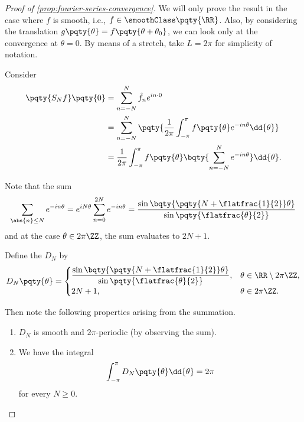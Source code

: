 \begin{proof}[Proof of \autoref{prop:fourier-series-convergence}]
    We will only prove the result in the case where \(f\) is smooth, i.e., \(f \in \smoothClass\pqty{\RR}\). Also, by considering the translation \(g\pqty{\theta} = f\pqty{\theta + \theta_0}\), we can look only at the convergence at \(\theta = 0\). By means of a stretch, take \(L = 2\pi\) for simplicity of notation.

    Consider
    \begin{subequations}
        \begin{align}
            \pqty{S_N f} \pqty{0} &= \sum_{n = -N}^{N} \hat{f}_n e^{in \cdot 0}\\
            &= \sum_{n = -N}^{N} \pqty{\frac{1}{2\pi} \int_{-\pi}^{\pi} f\pqty{\theta} e^{-in \theta} \dd{\theta}} \\
            &= \frac{1}{2\pi} \int_{-\pi}^{\pi} f\pqty{\theta} \bqty{\sum_{n = -N}^{N} e^{-in \theta}} \dd{\theta}.
        \end{align}
    \end{subequations}

    Note that the sum
    \begin{equation}
        \sum_{\abs{n} \leq N} e^{- i n \theta} = e^{i N \theta} \sum_{n = 0}^{2N} e^{- i n \theta} = \frac{\sin\bqty{\pqty{N + \flatfrac{1}{2}} \theta}}{\sin\pqty{\flatfrac{\theta}{2}}}
    \end{equation}
    and at the case \(\theta \in 2 \pi \ZZ\), the sum evaluates to \(2N + 1\).

    Define the  \(D_N\) by
    \begin{equation}
        D_N\pqty{\theta} = \begin{cases}
            \dfrac{\sin \bqty{\pqty{N + \flatfrac{1}{2}} \theta}}{\sin\pqty{\flatfrac{\theta}{2}}}, & \theta \in \RR \setminus 2 \pi \ZZ, \\
            2N + 1, & \theta \in 2 \pi \ZZ.
        \end{cases}
    \end{equation}

    Then note the following properties arising from the summation.

    \begin{enumerate}[label=(\roman*)]
        \item \(D_N\) is smooth and \(2\pi\)-periodic (by observing the sum).
        \item We have the integral
        \begin{equation}
            \int_{- \pi}^{\pi} D_N\pqty{\theta} \dd{\theta} = 2 \pi
        \end{equation}
        for every \(N \geq 0\).
    \end{enumerate}


\end{proof}
